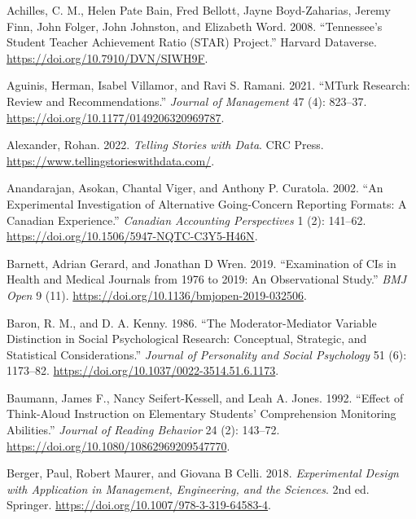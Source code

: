 \documentclass[
  11pt,
  letterpaper,
]{scrbook}
\newlength{\cslhangindent}
\newenvironment{CSLReferences}[2] %
 {\begin{list}{}{%
  \setlength{\itemindent}{0pt}
  \setlength{\leftmargin}{0pt}
  \setlength{\parsep}{0pt}
  \ifodd #1
   \setlength{\leftmargin}{\cslhangindent}
   \setlength{\itemindent}{-1\cslhangindent}
  \fi
  \setlength{\itemsep}{#2\baselineskip}}}
 {\end{list}}
\theoremstyle{definition}
\theoremstyle{definition}
\theoremstyle{remark}
\begin{document}
\label{refs}
\begin{CSLReferences}{1}{0}
Achilles, C. M., Helen Pate Bain, Fred Bellott, Jayne Boyd-Zaharias,
Jeremy Finn, John Folger, John Johnston, and Elizabeth Word. 2008.
{``Tennessee's Student Teacher Achievement Ratio (STAR) Project.''}
Harvard Dataverse. \url{https://doi.org/10.7910/DVN/SIWH9F}.

Aguinis, Herman, Isabel Villamor, and Ravi S. Ramani. 2021. {``{MT}urk
Research: Review and Recommendations.''} \emph{Journal of Management} 47
(4): 823--37. \url{https://doi.org/10.1177/0149206320969787}.

Alexander, Rohan. 2022. \emph{Telling Stories with Data}. CRC Press.
\url{https://www.tellingstorieswithdata.com/}.

Anandarajan, Asokan, Chantal Viger, and Anthony P. Curatola. 2002. {``An
Experimental Investigation of Alternative Going-Concern Reporting
Formats: A {C}anadian Experience.''} \emph{Canadian Accounting
Perspectives} 1 (2): 141--62.
\url{https://doi.org/10.1506/5947-NQTC-C3Y5-H46N}.

Barnett, Adrian Gerard, and Jonathan D Wren. 2019. {``Examination of
{CI}s in Health and Medical Journals from 1976 to 2019: An Observational
Study.''} \emph{BMJ Open} 9 (11).
\url{https://doi.org/10.1136/bmjopen-2019-032506}.

Baron, R. M., and D. A. Kenny. 1986. {``The Moderator-Mediator Variable
Distinction in Social Psychological Research: Conceptual, Strategic, and
Statistical Considerations.''} \emph{Journal of Personality and Social
Psychology} 51 (6): 1173--82.
\url{https://doi.org/10.1037/0022-3514.51.6.1173}.

Baumann, James F., Nancy Seifert-Kessell, and Leah A. Jones. 1992.
{``Effect of Think-Aloud Instruction on Elementary Students'
Comprehension Monitoring Abilities.''} \emph{Journal of Reading
Behavior} 24 (2): 143--72.
\url{https://doi.org/10.1080/10862969209547770}.

Berger, Paul, Robert Maurer, and Giovana B Celli. 2018.
\emph{Experimental Design with Application in Management, Engineering,
and the Sciences}. 2nd ed. Springer.
\url{https://doi.org/10.1007/978-3-319-64583-4}.


\end{CSLReferences}
\end{document}
